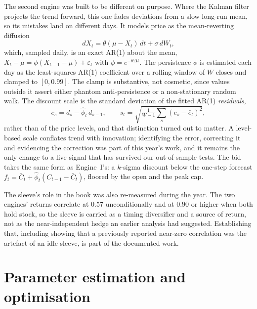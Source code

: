 \documentclass[11pt,a4paper]{article}
\begin{document}
The second engine was built to be different on purpose. Where the Kalman
filter projects the trend forward, this one fades deviations from a slow
long-run mean, so its mistakes land on different days. It models price as
the mean-reverting diffusion
\begin{equation}
dX_t=\theta(\mu-X_t)\,dt+\sigma\,dW_t,
\end{equation}
which, sampled daily, is an exact AR(1) about the mean,
$X_t-\mu=\phi(X_{t-1}-\mu)+\varepsilon_t$ with $\phi=e^{-\theta\Delta t}$.
The persistence $\phi$ is estimated each day as the least-squares AR(1)
coefficient over a rolling window of $W$ closes and clamped to $[0,0.99]$.
The clamp is substantive, not cosmetic, since values outside it assert
either phantom anti-persistence or a non-stationary random walk. The
discount scale is the standard deviation of the fitted AR(1)
\emph{residuals},
\begin{equation}
e_s = d_s-\hat\phi_t\,d_{s-1},\qquad
s_t=\sqrt{\tfrac{1}{W-1}\textstyle\sum_s (e_s-\bar e_t)^2},
\end{equation}
rather than of the price levels, and that distinction turned out to matter.
A level-based scale conflates trend with innovation; identifying the error,
correcting it and evidencing the correction was part of this year's work,
and it remains the only change to a live signal that has survived our
out-of-sample tests. The bid takes the same form as Engine~I's: a $k$-sigma
discount below the one-step forecast
$f_t=\bar C_t+\hat\phi_t(C_{t-1}-\bar C_t)$, floored by the open and the
peak cap.

The sleeve's role in the book was also re-measured during the year. The two
engines' returns correlate at $0.57$ unconditionally and at $0.90$ or higher
when both hold stock, so the sleeve is carried as a timing diversifier and a
source of return, not as the near-independent hedge an earlier analysis had
suggested. Establishing that, including showing that a previously reported
near-zero correlation was the artefact of an idle sleeve, is part of the
documented work.

\section{Parameter estimation and optimisation}
\end{document}
